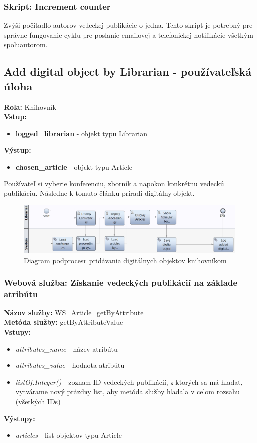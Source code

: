 \documentclass[10pt,oneside,slovak,a4paper]{article}
\begin{document}
\subsubsection{Skript: Increment counter}
Zvýši počítadlo autorov vedeckej publikácie o jedna. Tento skript je potrebný pre správne fungovanie cyklu pre poslanie emailovej a telefonickej notifikácie všetkým spoluautorom.

\subsection{Add digital object by Librarian - používateľská úloha}
\textbf{Rola:} Knihovník\\
\textbf{Vstup:}

\begin{itemize}
\item \textbf{logged\_librarian} - objekt typu Librarian
\end{itemize}

\textbf{Výstup:}

\begin{itemize}
\item \textbf{chosen\_article} - objekt typu Article
\end{itemize}

Používateľ si vyberie konferenciu, zborník a napokon konkrétnu vedeckú publikáciu. Následne k tomuto článku priradí digitálny objekt.

\begin{figure} [H]
\centering
\includegraphics[scale=0.4]{diagrams/diagAddDigitalLib.jpg} 
\caption{Diagram podprocesu pridávania digitálnych objektov knihovníkom}
\end{figure}

\subsubsection{Webová služba: Získanie vedeckých publikácií na základe atribútu}
\textbf{Názov služby:} WS\_Article\_getByAttribute\\
\textbf{Metóda služby:} getByAttributeValue\\
\textbf{Vstupy:}
	\begin{itemize}
		\item \textit{attributes\_name} - názov atribútu
		\item \textit{attributes\_value} - hodnota atribútu
		\item \textit{listOf.Integer()} - zoznam ID vedeckých publikácií, z ktorých sa má hľadať, vytvárame nový prázdny list, aby metóda služby hľadala v celom rozsahu (všetkých IDs)
	\end{itemize}
\textbf{Výstupy:}
	\begin{itemize}
		\item \textit{articles} - list objektov typu Article
	\end{itemize}
\end{document}

